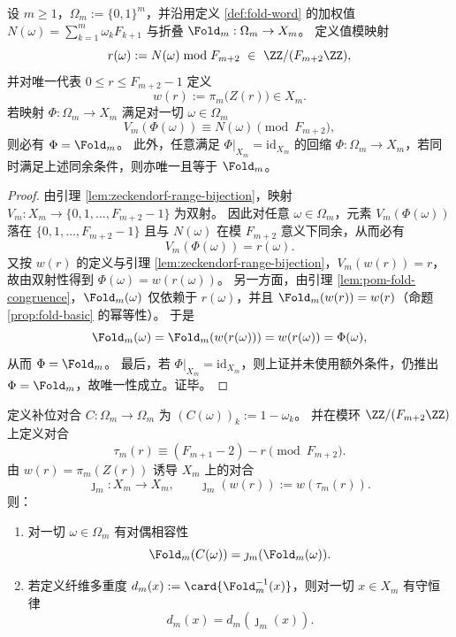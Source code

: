 \begin{theorem}[折叠算子的同余刚性与泛性质唯一性]\label{thm:fold-congruence-universal-property}
设 \(m\ge 1\)，\(\Omega_m:=\{0,1\}^m\)，并沿用定义 \ref{def:fold-word} 的加权值 \(N(\omega)=\sum_{k=1}^m \omega_kF_{k+1}\) 与折叠 \(\Fold_m:\Omega_m\to X_m\)。
定义值模映射
\[
r(\omega):=N(\omega)\bmod F_{m+2}\ \in\ \ZZ/(F_{m+2}\ZZ),
\]
并对唯一代表 \(0\le r\le F_{m+2}-1\) 定义
\[
w(r):=\pi_m\bigl(Z(r)\bigr)\in X_m.
\]
若映射 \(\Phi:\Omega_m\to X_m\) 满足对一切 \(\omega\in\Omega_m\)
\[
V_m(\Phi(\omega))\equiv N(\omega)\pmod{F_{m+2}},
\]
则必有 \(\Phi=\Fold_m\)。
此外，任意满足 \(\Phi|_{X_m}=\mathrm{id}_{X_m}\) 的回缩 \(\Phi:\Omega_m\to X_m\)，若同时满足上述同余条件，则亦唯一且等于 \(\Fold_m\)。
\end{theorem}

\begin{proof}
由引理 \ref{lem:zeckendorf-range-bijection}，映射 \(V_m:X_m\to\{0,1,\dots,F_{m+2}-1\}\) 为双射。
因此对任意 \(\omega\in\Omega_m\)，元素 \(V_m(\Phi(\omega))\) 落在 \(\{0,1,\dots,F_{m+2}-1\}\) 且与 \(N(\omega)\) 在模 \(F_{m+2}\) 意义下同余，从而必有
\[
V_m(\Phi(\omega))=r(\omega).
\]
又按 \(w(r)\) 的定义与引理 \ref{lem:zeckendorf-range-bijection}，\(V_m(w(r))=r\)，故由双射性得到
\(
\Phi(\omega)=w(r(\omega))
\)。
另一方面，由引理 \ref{lem:pom-fold-congruence}，\(\Fold_m(\omega)\) 仅依赖于 \(r(\omega)\)，并且 \(\Fold_m(w(r))=w(r)\)（命题 \ref{prop:fold-basic} 的幂等性）。
于是
\[
\Fold_m(\omega)=\Fold_m(w(r(\omega)))=w(r(\omega))=\Phi(\omega),
\]
从而 \(\Phi=\Fold_m\)。
最后，若 \(\Phi|_{X_m}=\mathrm{id}_{X_m}\)，则上证并未使用额外条件，仍推出 \(\Phi=\Fold_m\)，故唯一性成立。证毕。
\end{proof}

\begin{proposition}\label{prop:fold-complement-duality}
定义补位对合 \(C:\Omega_m\to\Omega_m\) 为
\(
(C(\omega))_k:=1-\omega_k
\)。
并在模环 \(\ZZ/(F_{m+2}\ZZ)\) 上定义对合
\[
\tau_m(r)\equiv (F_{m+1}-2)-r\pmod{F_{m+2}}.
\]
由 \(w(r)=\pi_m(Z(r))\) 诱导 \(X_m\) 上的对合
\[
\jmath_m:X_m\to X_m,\qquad \jmath_m(w(r)):=w(\tau_m(r)).
\]
则：
\begin{enumerate}
\normalfont
  \item 对一切 \(\omega\in\Omega_m\) 有对偶相容性
  \[
  \Fold_m(C(\omega))=\jmath_m(\Fold_m(\omega)).
  \]
  \item 若定义纤维多重度 \(d_m(x):=\card{\Fold_m^{-1}(x)}\)，则对一切 \(x\in X_m\) 有守恒律
  \[
  d_m(x)=d_m(\jmath_m(x)).
  \]
\end{enumerate}
\end{proposition}

